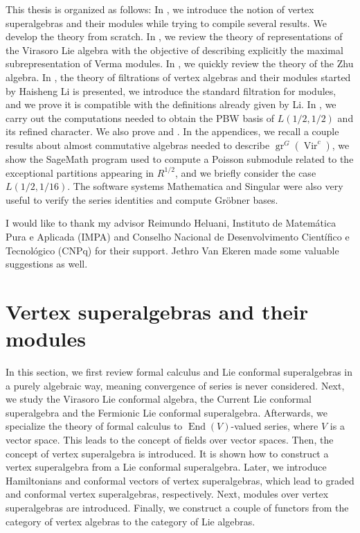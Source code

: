 \documentclass[a4paper, 12pt, reqno]{amsart}
\theoremstyle{remark}
\numberwithin{equation}{subsection}
\DeclareMathOperator{\Vir}{Vir}
\DeclareMathOperator{\gr}{gr}
\DeclareMathOperator{\End}{End}
\begin{document}
This thesis is organized as follows: In , we introduce the notion of vertex superalgebras and their modules while trying to compile several results.
We develop the theory from scratch.
In , we review the theory of representations of the Virasoro Lie algebra with the objective of describing explicitly the maximal subrepresentation of Verma modules.
In , we quickly review the theory of the Zhu algebra.
In , the theory of filtrations of vertex algebras and their modules started by Haisheng Li is presented, we introduce the standard filtration for modules, and we prove it is compatible with the definitions already given by Li.
In , we carry out the computations needed to obtain the PBW basis of $L(1/2, 1/2)$ and its refined character.
We also prove  and .
In the appendices, we recall a couple results about almost commutative algebras needed to describe $\gr^G(\Vir^c)$, we show the SageMath \cite{sagemath} program used to compute a Poisson submodule related to the exceptional partitions appearing in $R^{1/2}$, and we briefly consider the case $L(1/2, 1/16)$.
The software systems Mathematica \cite{Mathematica} and Singular \cite{Singular} were also very useful to verify the series identities and compute Gr\"{o}bner bases.

I would like to thank my advisor Reimundo Heluani, Instituto de Matemática Pura e Aplicada (IMPA) and Conselho Nacional de Desenvolvimento Científico e Tecnológico (CNPq) for their support.
Jethro Van Ekeren made some valuable suggestions as well.


\section{Vertex superalgebras and their modules}
\label{sec:vert-supera-their}

In this section, we first review formal calculus and Lie conformal superalgebras in a purely algebraic way, meaning convergence of series is never considered.
Next, we study the Virasoro Lie conformal algebra, the Current Lie conformal superalgebra and the Fermionic Lie conformal superalgebra.
Afterwards, we specialize the theory of formal calculus to $\End(V)$-valued series, where $V$ is a vector space.
This leads to the concept of fields over vector spaces.
Then, the concept of vertex superalgebra is introduced.
It is shown how to construct a vertex superalgebra from a Lie conformal superalgebra.
Later, we introduce Hamiltonians and conformal vectors of vertex superalgebras, which lead to graded and conformal vertex superalgebras, respectively.
Next, modules over vertex superalgebras are introduced.
Finally, we construct a couple of functors from the category of vertex algebras to the category of Lie algebras.
\end{document}
